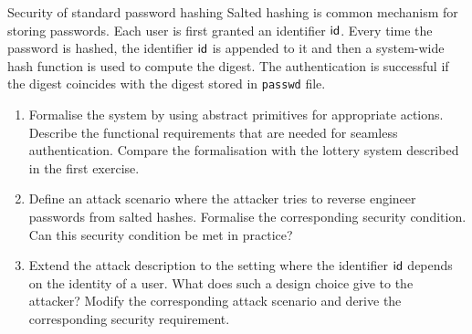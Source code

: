 \documentclass{crypto-exercise}
\begin{document}
\begin{exercise}{Security of standard password hashing}
  Salted hashing is common mechanism for storing passwords. Each user
  is first granted an identifier $\mathsf{id}$. Every time the password
  is hashed, the identifier $\mathsf{id}$ is appended to it and then a
  system-wide hash function is used to compute the digest. The
  authentication is successful if the digest coincides with the digest
  stored in \texttt{passwd} file.
  \begin{enumerate}
  \item Formalise the system by using abstract primitives for
    appropriate actions. Describe the functional requirements that are
    needed for seamless authentication. Compare the formalisation with
    the lottery system described in the first exercise.
  \item Define an attack scenario where the attacker tries to reverse
    engineer passwords from salted hashes. Formalise the corresponding
    security condition. Can this security condition be met in
    practice?
  \item Extend the attack description to the setting where the
    identifier $\mathsf{id}$ depends on the identity of a user. What does such
    a design choice give to the attacker? Modify the corresponding
    attack scenario and derive the corresponding security requirement.
  \end{enumerate}
\end{exercise}
\end{document}
